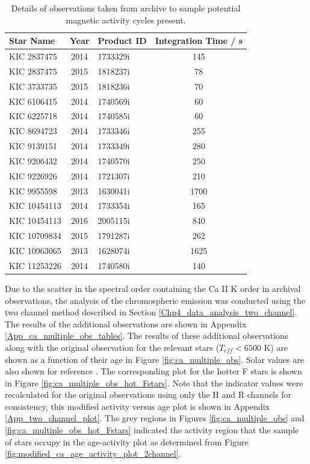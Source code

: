 \begin{table}
\centering
\begin{tabular}{lclc}
\hline
Star Name    & Year & Product ID & Integration Time / s \\
\hline
KIC 2837475  & 2014 & 1733329i   & 145                  \\
KIC 2837475  & 2015 & 1818237i   & 78                   \\
KIC 3733735  & 2015 & 1818236i   & 70                   \\
KIC 6106415  & 2014 & 1740569i   & 60                   \\
KIC 6225718  & 2014 & 1740585i   & 60                   \\
KIC 8694723  & 2014 & 1733346i   & 255                  \\
KIC 9139151  & 2014 & 1733349i   & 280                  \\
KIC 9206432  & 2014 & 1740570i   & 250                  \\
KIC 9226926  & 2014 & 1721307i   & 210                  \\
KIC 9955598  & 2013 & 1630041i   & 1700                 \\
KIC 10454113 & 2014 & 1733354i   & 165                  \\
KIC 10454113 & 2016 & 2005115i   & 840                  \\
KIC 10709834 & 2015 & 1791287i   & 262                  \\
KIC 10963065 & 2013 & 1628074i   & 1625                 \\
KIC 11253226 & 2014 & 1740580i   & 140					\\
\hline
\end{tabular}
\caption[Details of archival \esp observations]{Details of observations taken from \esp archive to sample potential magnetic activity cycles present.}
\label{Table:esp_additional_obs_table}
\end{table}

Due to the scatter in the spectral order containing the Ca II K order in archival observations, the analysis of the chromospheric emission was conducted using the two channel method described in Section \ref{Chp4_data_analysis_two_channel}. The results of the additional observations are shown in Appendix \ref{App_ca_multiple_obs_tables}. The results of these additional observations along with the original observation for the relevant stars ($T_{eff} < 6500$ K) are shown as a function of their age in Figure \ref{fig:ca_multiple_obs}. Solar values are also shown for reference \citep{Egeland_etal_2017}. The corresponding plot for the hotter F stars is shown in Figure \ref{fig:ca_multiple_obs_hot_Fstars}. Note that the \Rprime indicator values were recalculated for the original observations using only the H and R channels for consistency, this modified activity versus age plot is shown in Appendix \ref{App_two_channel_plot}. The grey regions in Figures \ref{fig:ca_multiple_obs} and \ref{fig:ca_multiple_obs_hot_Fstars} indicated the activity region that the sample of stars occupy in the age-activity plot as determined from Figure \ref{fig:modified_ca_age_activity_plot_2channel}.

